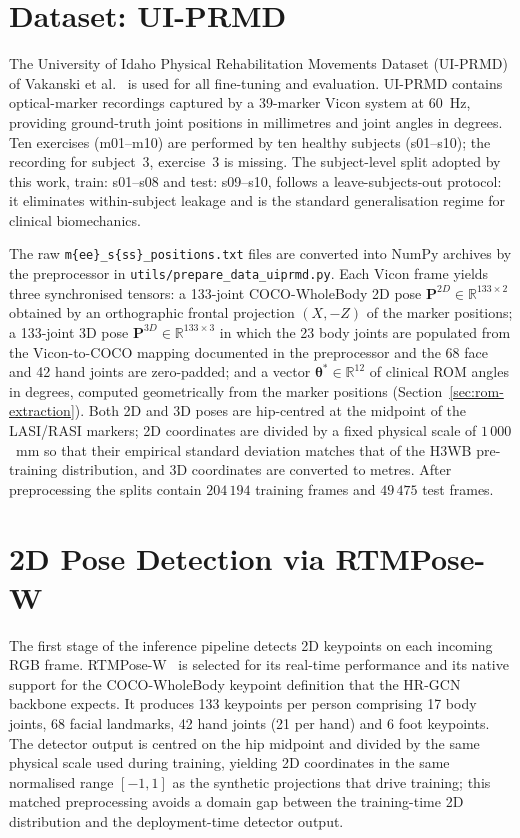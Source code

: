 \section{Dataset: UI-PRMD}
\label{sec:dataset}

The University of Idaho Physical Rehabilitation Movements Dataset
(UI-PRMD) of Vakanski et al.~\cite{vakanski2018uiprmd} is used for all
fine-tuning and evaluation. UI-PRMD contains optical-marker recordings
captured by a 39-marker Vicon system at 60~Hz, providing ground-truth
joint positions in millimetres and joint angles in degrees. Ten
exercises (m01--m10) are performed by ten healthy subjects (s01--s10);
the recording for subject~3, exercise~3 is missing. The subject-level
split adopted by this work, train: s01--s08 and test: s09--s10, follows
a leave-subjects-out protocol: it eliminates within-subject leakage
and is the standard generalisation regime for clinical biomechanics.

The raw \texttt{m\{ee\}\_s\{ss\}\_positions.txt} files are converted
into NumPy archives by the preprocessor in
\texttt{utils/prepare\_data\_uiprmd.py}. Each Vicon frame yields three
synchronised tensors: a 133-joint COCO-WholeBody 2D pose
$\mathbf{P}^{2D}\!\in\!\mathbb{R}^{133\times 2}$ obtained by an
orthographic frontal projection $(X,-Z)$ of the marker positions;
a 133-joint 3D pose
$\mathbf{P}^{3D}\!\in\!\mathbb{R}^{133\times 3}$ in which the 23 body
joints are populated from the Vicon-to-COCO mapping documented in
the preprocessor and the 68 face and 42 hand joints are zero-padded;
and a vector $\boldsymbol{\theta}^{*}\!\in\!\mathbb{R}^{12}$ of clinical
ROM angles in degrees, computed geometrically from the marker positions
(Section~\ref{sec:rom-extraction}). Both 2D and 3D poses are
hip-centred at the midpoint of the LASI/RASI markers; 2D coordinates
are divided by a fixed physical scale of $1\,000$~mm so that their
empirical standard deviation matches that of the H3WB pre-training
distribution, and 3D coordinates are converted to metres. After
preprocessing the splits contain $204\,194$ training frames and
$49\,475$ test frames.

\section{2D Pose Detection via RTMPose-W}
\label{sec:rtmpose}

The first stage of the inference pipeline detects 2D keypoints on each
incoming RGB frame. RTMPose-W~\cite{jiang2023rtmpose} is selected for
its real-time performance and its native support for the COCO-WholeBody
keypoint definition that the HR-GCN backbone expects. It produces 133
keypoints per person comprising 17 body joints, 68 facial landmarks,
42 hand joints (21 per hand) and 6 foot keypoints. The detector
output is centred on the hip midpoint and divided by the same physical
scale used during training, yielding 2D coordinates in the same
normalised range $[-1,1]$ as the synthetic projections that drive
training; this matched preprocessing avoids a domain gap between the
training-time 2D distribution and the deployment-time detector output.

